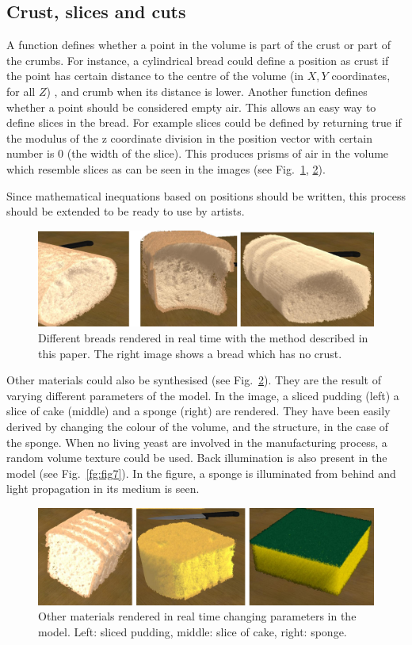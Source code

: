 \documentclass[oneside,a4paper,english,links]{amca}
\begin{document}
\subsection{Crust, slices and cuts}
A function defines whether a point in the volume is part of the crust
or part of the crumbs. For instance, a cylindrical bread could define
a position as crust if the point has certain distance to the centre of
the volume (in $X,Y$ coordinates, for all $Z$) , and crumb when its
distance is lower. Another function defines whether a point should be
considered empty air. This allows an easy way to define slices in the
bread. For example slices could be defined by returning true if the
modulus of the z coordinate division in the position vector with
certain number is $0$ (the width of the slice).  This produces prisms
of air in the volume which resemble slices as can be seen in the
images (see Fig.~\ref{fg:fig5}, \ref{fg:fig6}).

Since mathematical inequations based on positions should be written, this process should be extended to be ready to use by artists.

\begin{figure}[htb!]
  \centerline{\includegraphics[scale=0.3]{fig5}}
  \caption{Different breads rendered in real time with the method described in this paper. The right image shows a bread which has no crust. }
  \label{fg:fig5}
\end{figure}

Other materials could also be synthesised (see
Fig.~\ref{fg:fig6}). They are the result of varying different
parameters of the model. In the image, a sliced pudding (left) a slice
of cake (middle) and a sponge (right) are rendered. They have been
easily derived by changing the colour of the volume, and the structure,
in the case of the sponge. When no living yeast are involved in the
manufacturing process, a random volume texture could be used. Back
illumination is also present in the model (see Fig.~\ref{fg:fig7}). In
the figure, a sponge is illuminated from behind and light propagation
in its medium is seen.

\begin{figure}[htb!]
  \centerline{\includegraphics[scale=0.3]{fig6}}
  \caption{Other materials rendered in real time changing parameters in the model. Left: sliced pudding, middle: slice of cake, right: sponge. }
  \label{fg:fig6}
\end{figure}
\end{document}
